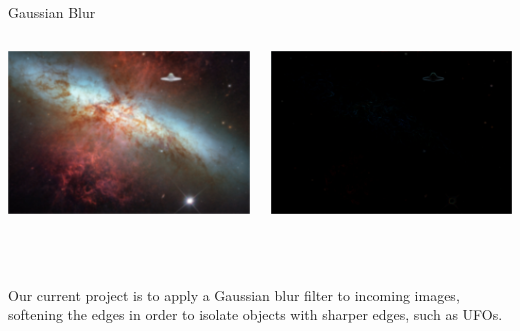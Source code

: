 \documentclass[xcolor=dvipsnames]{beamer}
\begin{document}
	\begin{frame}[t]{Gaussian Blur}
		\begin{columns}
			\begin{column}{0.5\textwidth}
				\includegraphics[width=\textwidth]{images/gaussian}
		\end{column}
		\begin{column}{0.5\textwidth}
				\includegraphics[width=\textwidth]{images/gaussian_edges}
		\end{column}
		\end{columns}
		~\\~\\
		Our current project is to apply a Gaussian blur filter to incoming images, softening the edges in order to isolate objects with sharper edges, such as UFOs.
	\end{frame}
	
\end{document}
